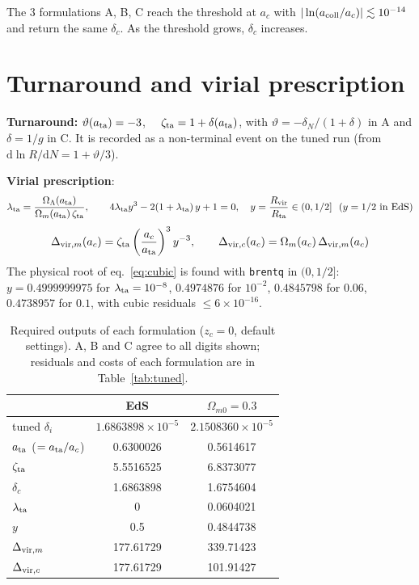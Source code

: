 \documentclass[11pt,a4paper]{article}
\begin{document}
The 3 formulations A, B, C reach the threshold at $a_c$ with $|\ln(a_{\rm coll}/a_c)|\lesssim10^{-14}$ and return the same $\delta_c$. As the threshold grows, $\delta_c$ increases.

\section{Turnaround and virial prescription}

\textbf{Turnaround:} $\vartheta(a_{\rm ta}) = -3$, $\quad \zeta_{\rm ta} = 1+\delta(a_{\rm ta})$, with $\vartheta=-\delta_N/(1+\delta)$ in A and $\delta = 1/g$ in C. It is recorded as a non-terminal event on the tuned run (from $\mathrm d\ln R/\mathrm dN=1+\vartheta/3$).

\textbf{Virial prescription}:
\begin{equation}
\lambda_{\rm ta} = \frac{\Omega_\Lambda(a_{\rm ta})}{\Omega_m(a_{\rm ta})\,\zeta_{\rm ta}}, \qquad
4\lambda_{\rm ta}y^3 - 2(1+\lambda_{\rm ta})\,y + 1 = 0, \quad y = \frac{R_{\rm vir}}{R_{\rm ta}} \in (0, 1/2]\ \ (y = 1/2 \text{ in EdS})
\label{eq:cubic}
\end{equation}
\begin{equation}
\Delta_{{\rm vir},m}(a_c) = \zeta_{\rm ta}\left(\frac{a_c}{a_{\rm ta}}\right)^3 y^{-3}, \qquad
\Delta_{{\rm vir},c}(a_c) = \Omega_m(a_c)\,\Delta_{{\rm vir},m}(a_c)
\label{eq:dvir}
\end{equation}
The physical root of eq.~\eqref{eq:cubic} is found with \texttt{brentq} in $(0,1/2]$: $y=0.4999999975$ for $\lambda_{\rm ta}=10^{-8}$, $0.4974876$ for $10^{-2}$, $0.4845798$ for $0.06$, $0.4738957$ for $0.1$, with cubic residuals $\le6\times10^{-16}$.

\begin{table}[htbp]
\centering
\caption{Required outputs of each formulation ($z_c=0$, default settings). A, B and C agree to all digits shown; residuals and costs of each formulation are in Table~\ref{tab:tuned}.}
\label{tab:outputs}
\small
\begin{tabular}{l c c}
\toprule
& EdS & $\Omega_{m0}=0.3$\\
\midrule
tuned $\delta_i$ & $1.6863898\times10^{-5}$ & $2.1508360\times10^{-5}$\\
$a_{\rm ta}$ ($=a_{\rm ta}/a_c$) & 0.6300026 & 0.5614617\\
$\zeta_{\rm ta}$ & 5.5516525 & 6.8373077\\
$\delta_c$ & 1.6863898 & 1.6754604\\
$\lambda_{\rm ta}$ & 0 & 0.0604021\\
$y$ & 0.5 & 0.4844738\\
$\Delta_{{\rm vir},m}$ & 177.61729 & 339.71423\\
$\Delta_{{\rm vir},c}$ & 177.61729 & 101.91427\\
\bottomrule
\end{tabular}
\end{table}
\end{document}
